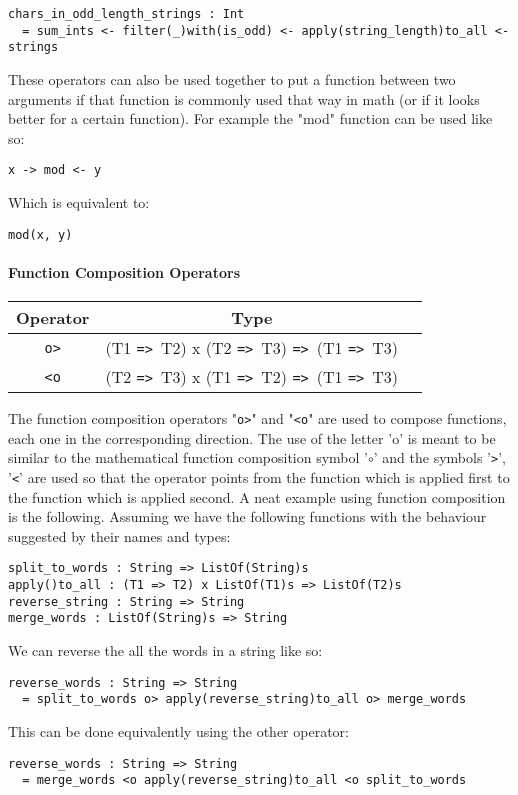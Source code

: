 \documentclass{article}
\def\ra{\texttt{=>}\ }
\begin{document}
\begin{verbatim}
chars_in_odd_length_strings : Int
  = sum_ints <- filter(_)with(is_odd) <- apply(string_length)to_all <- strings

\end{verbatim}
These operators can also be used together to put a function between two
arguments if that function is commonly used that way in math (or if it looks
better for a certain function). For example the "mod" function can be used like
so:
\begin{center}
\texttt{x -> mod <- y}
\end{center}
Which is equivalent to:
\begin{center}
\texttt{mod(x, y)}
\end{center}

\newpage

\paragraph{Function Composition Operators}
\begin{center}
\begin{tabular}{ |c|c|c| } 
\hline
Operator & Type
\\ 
\hline
\hline
\texttt{o>} & (T1 \ra T2) x (T2 \ra T3) \ra (T1 \ra T3)
\\
\hline
\texttt{<o} & (T2 \ra T3) x (T1 \ra T2) \ra (T1 \ra T3)
\\
\hline
\end{tabular}
\end{center}
The function composition operators "\texttt{o>}" and "\texttt{<o}" are used to
compose functions, each one in the corresponding direction. The use of the
letter 'o' is meant to be similar to the mathematical function composition
symbol '\(\circ\)' and the symbols '\texttt{>}', '\texttt{<}' are used so that
the operator points from the function which is applied first to the function
which is applied second.  A neat example using function composition is the
following. Assuming we have the following functions with the behaviour
suggested by their names and types: 
\begin{verbatim}
split_to_words : String => ListOf(String)s
apply()to_all : (T1 => T2) x ListOf(T1)s => ListOf(T2)s
reverse_string : String => String
merge_words : ListOf(String)s => String
\end{verbatim}
We can reverse the all the words in a string like so:
\begin{verbatim}
reverse_words : String => String
  = split_to_words o> apply(reverse_string)to_all o> merge_words
\end{verbatim}
This can be done equivalently using the other operator:
\begin{verbatim}
reverse_words : String => String
  = merge_words <o apply(reverse_string)to_all <o split_to_words
\end{verbatim}
\end{document}
